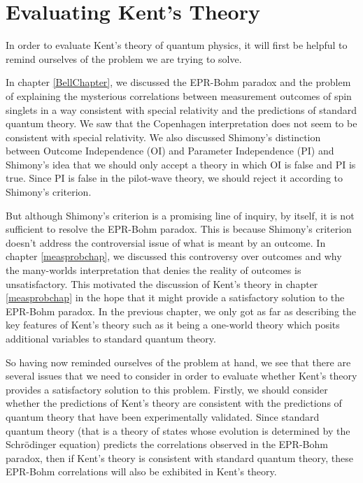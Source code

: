 \chapter{Evaluating Kent's Theory\label{KentEval}}
In order to evaluate Kent's theory of quantum physics, it will first be helpful to remind ourselves of the problem we are trying to solve. 

In chapter \ref{BellChapter}, we discussed the EPR-Bohm paradox and the problem of explaining  the mysterious correlations between measurement outcomes of spin singlets in a way consistent with special relativity and the predictions of standard quantum theory. We saw that the Copenhagen interpretation does not seem to be consistent with special relativity. We also discussed Shimony's distinction between Outcome Independence (OI) and Parameter Independence (PI) and Shimony's idea that we should only accept a theory in which OI is false and PI is true. Since PI is false in the pilot-wave theory, we should reject it according to Shimony's criterion. 

But although Shimony's criterion is a promising line of inquiry, by itself, it is not sufficient to resolve the  EPR-Bohm paradox. This is because Shimony's criterion doesn't address the controversial issue of what is meant by an outcome. In chapter \ref{measprobchap}, we discussed this controversy over outcomes and why the many-worlds interpretation that denies the reality of outcomes is unsatisfactory. This motivated the discussion of Kent's theory in chapter \ref{measprobchap} in the hope that it might provide a satisfactory solution to the EPR-Bohm paradox. In the previous chapter, we only got as far as describing the key features of Kent's theory such as it being a one-world theory which posits additional variables to standard quantum theory. 

So having now reminded ourselves of the problem at hand, we see that there are several issues that we need to consider in order to evaluate whether Kent's theory provides a satisfactory solution to this problem. Firstly, we should consider whether the predictions of Kent's theory are consistent with the  predictions of quantum theory that have been experimentally validated. Since standard quantum theory (that is a theory of states whose evolution is determined by the Schr\"{o}dinger equation) predicts the correlations observed in the EPR-Bohm paradox, then if Kent's theory is consistent with standard quantum theory, these EPR-Bohm correlations will also be exhibited in Kent's theory. 

